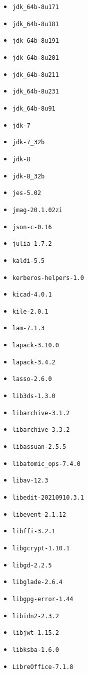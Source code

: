 \begin{multicols}{3}
\begin{itemize}
\item \verb|jdk_64b-8u171|
\item \verb|jdk_64b-8u181|
\item \verb|jdk_64b-8u191|
\item \verb|jdk_64b-8u201|
\item \verb|jdk_64b-8u211|
\item \verb|jdk_64b-8u231|
\item \verb|jdk_64b-8u91|
\item \verb|jdk-7|
\item \verb|jdk-7_32b|
\item \verb|jdk-8|
\item \verb|jdk-8_32b|
\item \verb|jes-5.02|
\item \verb|jmag-20.1.02zi|
\item \verb|json-c-0.16|
\item \verb|julia-1.7.2|
\item \verb|kaldi-5.5|
\item \verb|kerberos-helpers-1.0|
\item \verb|kicad-4.0.1|
\item \verb|kile-2.0.1|
\item \verb|lam-7.1.3|
\item \verb|lapack-3.10.0|
\item \verb|lapack-3.4.2|
\item \verb|lasso-2.6.0|
\item \verb|lib3ds-1.3.0|
\item \verb|libarchive-3.1.2|
\item \verb|libarchive-3.3.2|
\item \verb|libassuan-2.5.5|
\item \verb|libatomic_ops-7.4.0|
\item \verb|libav-12.3|
\item \verb|libedit-20210910.3.1|
\item \verb|libevent-2.1.12|
\item \verb|libffi-3.2.1|
\item \verb|libgcrypt-1.10.1|
\item \verb|libgd-2.2.5|
\item \verb|libglade-2.6.4|
\item \verb|libgpg-error-1.44|
\item \verb|libidn2-2.3.2|
\item \verb|libjwt-1.15.2|
\item \verb|libksba-1.6.0|
\item \verb|LibreOffice-7.1.8|

\end{itemize}
\end{multicols}
